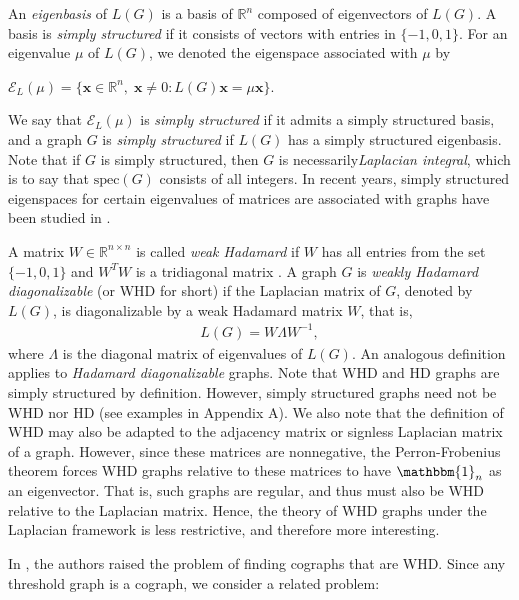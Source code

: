 \documentclass[preprint]{elsarticle}
\newcommand\spec{{\mathrm{spec}}}
\begin{document}
An \textit{eigenbasis} of $L(G)$ is a basis of $\mathbb{R}^n$ composed of eigenvectors of $L(G)$. A basis is \textit{simply structured} if it  consists of vectors with entries in $\{-1,0,1\}$. For an eigenvalue $\mu$ of $L(G)$, we denoted the eigenspace associated with $\mu$ by
\begin{center}
$\mathcal{E}_{L}(\mu) = \{\mathbf{x} \in \mathbb{R}^{n}, \; \mathbf{x}\ne 0: L(G)\mathbf{x} = \mu \mathbf{x} \}.$ 
\end{center}
We say that $\mathcal{E}_{L}(\mu)$ is \textit{simply structured} if it admits a simply structured basis, and a graph $G$ is \textit{simply structured} if $L(G)$ has a simply structured eigenbasis. Note that if $G$ is simply structured, then $G$ is necessarily\textit{Laplacian integral}, which is to say that $\spec(G)$ consists of all integers. In recent years, simply structured eigenspaces for certain eigenvalues of matrices are associated with graphs have been studied in \cite{AAGK06,AL21, ALN23,  SS08,SS07, SS09}. 

A matrix $W \in \mathbb{R}^{n \times n}$ is called \textit{weak Hadamard} if $W$ has all entries from the set $\{-1,0,1\}$ and $W^{T}W$ is a tridiagonal matrix \cite{WHD}. A graph $G$ is \textit{weakly Hadamard  diagonalizable} (or WHD for short) if the Laplacian matrix of $G$, denoted by $L(G)$, is diagonalizable by a weak Hadamard matrix $W$, that is, 
\begin{align*}
        L(G) = W\Lambda W^{-1},
    \end{align*}
where $\Lambda$ is the diagonal matrix of eigenvalues of $L(G).$ An analogous definition applies to \textit{Hadamard diagonalizable} graphs. Note that WHD and HD graphs are simply structured by definition. However, simply structured graphs need not be WHD nor HD (see examples in Appendix A). We also note that the definition of WHD may also be adapted to the adjacency matrix or signless Laplacian matrix of a graph. However, since these matrices are nonnegative, the Perron-Frobenius theorem forces WHD graphs relative to these matrices to have $\mathbbm{1}_n$ as an eigenvector. That is, such graphs are regular, and thus must also be WHD relative to the Laplacian matrix. Hence, the theory of WHD graphs under the Laplacian framework is less restrictive, and therefore more interesting.

In \cite{WHD}, the authors raised the problem of finding cographs that are WHD. Since any threshold graph is a cograph, we consider a related problem:

\vspace{0.2cm}
\end{document}
